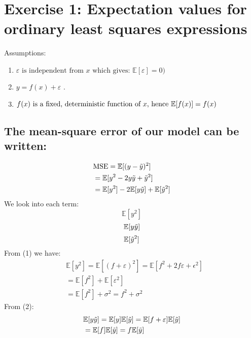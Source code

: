 \section{Exercise 1: Expectation values for ordinary least squares expressions}
Assumptions:
\begin{enumerate}
    \item $\varepsilon \text{ is independent from } x \text{ which gives: }\mathbb{E}[\varepsilon]=0)$
    \item $y=f(x) + \varepsilon$ .
    \item $f(x) \text{ is a fixed, deterministic function of } x \text{, hence }\\ \mathbb{E}[f(x)]=f(x)$
\end{enumerate}
\hfill\break
\subsection{The mean-square error of our model can be written:}
%
%
\begin{align*}
    & \text{MSE} = \mathbb{E}[(y-\Tilde{y})^2]\\
    & = \mathbb{E}[y^2-2y\Tilde{y}+\Tilde{y}^2]\\
    & = \mathbb{E}[y^2]-2\mathbb{E}[y\Tilde{y}]+\mathbb{E}[\Tilde{y}^2]\\
\end{align*}
%
We look into each term:
\begin{equation}
\mathbb{E}[y^2]
\end{equation}
\begin{equation}
    \mathbb{E}[y\Tilde{y}]
\end{equation}
\begin{equation}
    \mathbb{E}[\Tilde{y}^2]
\end{equation}
%
From (1) we have:
 \begin{align*}
     & \mathbb{E}[y^2]=\mathbb{E}[(f+\varepsilon)^2]=\mathbb{E}[f^2+2f\varepsilon+\epsilon^2]\\
     & = \mathbb{E}[f^2]+\mathbb{E}[\varepsilon^2]\\
     & =  \mathbb{E}[f^2]+\sigma^2 = f^2+\sigma^2
 \end{align*}
From (2):
\begin{align*}
    & \mathbb{E}[y\Tilde{y}]=\mathbb{E}[y]\mathbb{E}[\Tilde{y}]
     = \mathbb{E}[f+\varepsilon]\mathbb{E}[\Tilde{y}]\\
    & =\mathbb{E}[f]\mathbb{E}[\Tilde{y}]=f\mathbb{E}[\Tilde{y}]
\end{align*}
